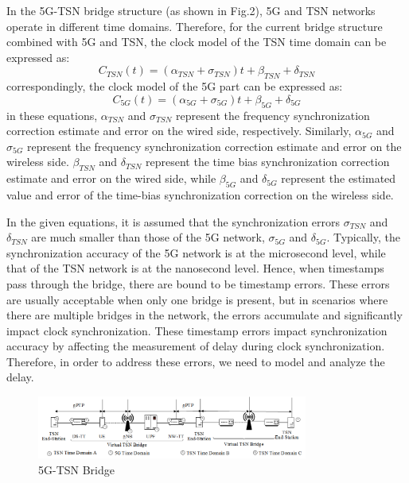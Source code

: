 \documentclass[english]{cccconf}
\begin{document}
{In the 5G-TSN bridge structure (as shown in Fig.2), 5G and TSN networks operate in different time domains. Therefore, for the current bridge structure combined with 5G and TSN, the clock model of the TSN time domain can be expressed as:
\begin{equation}
	C_{TSN}(t) = (\alpha_{TSN}+\sigma_{TSN})t + \beta _{TSN} +\delta_{TSN}
\end{equation}
 correspondingly, the clock model of the 5G part can be expressed as:
 \begin{equation}
 	C_{5G}(t) = (\alpha_{5G}+\sigma_{5G})t + \beta _{5G} +\delta_{5G}
 \end{equation}
in these equations, $\alpha_{TSN}$ and $\sigma_{TSN}$ represent the frequency synchronization correction estimate and error on the wired side, respectively. Similarly, $\alpha_{5G}$ and $\sigma_{5G}$ represent the frequency synchronization correction estimate and error on the wireless side. $\beta_{TSN}$ and $\delta_{TSN}$ represent the time bias synchronization correction estimate and error on the wired side, while $\beta_{5G}$ and $\delta_{5G}$ represent the estimated value and error of the time-bias synchronization correction on the wireless side. 

In the given equations, it is assumed that the synchronization errors $\sigma_{TSN}$ and $\delta_{TSN}$ are much smaller than those of the 5G network, $\sigma_{5G}$ and $\delta_{5G}$. Typically, the synchronization accuracy of the 5G network is at the microsecond level, while that of the TSN network is at the nanosecond level. Hence, when timestamps pass through the bridge, there are bound to be timestamp errors. These errors are usually acceptable when only one bridge is present, but in scenarios where there are multiple bridges in the network, the errors accumulate and significantly impact clock synchronization. These timestamp errors impact synchronization accuracy by affecting the measurement of delay during clock synchronization. Therefore, in order to address these errors, we need to model and analyze the delay.
\begin{figure}[htbp]
	\centering
	\setcounter{figure}{1}
	\includegraphics[width=3.5in]{fig12.png}
	\caption{5G-TSN Bridge}
\end{figure}
}
\end{document}
